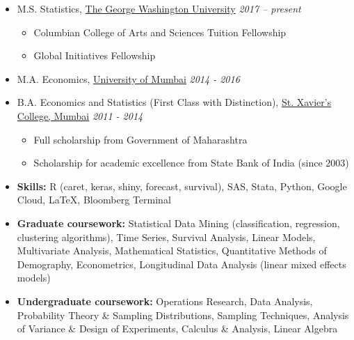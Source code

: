 \documentclass[10pt,a4paper]{article}
\begin{document}
\begin{itemize}
	\itemsep-0.25em
\item M.S. Statistics, \href{https://www.gwu.edu/}{The George Washington University}
\hfill \textit{2017 -- present} 
	\vspace{-0.6em}
	\begin{itemize}
	\itemsep-0.12em
		\item Columbian College of Arts and Sciences Tuition Fellowship
		\item Global Initiatives Fellowship
	\end{itemize}
	\vspace{-0.3em}
\item M.A. Economics, \href{http://mu.ac.in/portal/}{University of Mumbai}
\hfill \textit{2014 - 2016}

\item B.A. Economics and Statistics (First Class with Distinction), \href{http://xaviers.edu/main/}{St. Xavier's College, Mumbai}
\hfill \textit{2011 - 2014}
	\vspace{-0.6em}
	\begin{itemize}
	\itemsep-0.15em
		\item Full scholarship from Government of Maharashtra
		\item Scholarship for academic excellence from State Bank of India (since 2003)
	\end{itemize}
\end{itemize}
\vspace{-0.6cm}
\begin{itemize}
	\itemsep-0.15em
\item \textbf{Skills: }R (caret, keras, shiny, forecast, survival), SAS, Stata, Python, Google Cloud, \LaTeX, Bloomberg Terminal
\item \textbf{Graduate coursework: }Statistical Data Mining (classification, regression, clustering algorithms), Time Series, Survival Analysis, Linear Models, Multivariate Analysis, Mathematical Statistics, Quantitative Methods of Demography, Econometrics, Longitudinal Data Analysis (linear mixed effects models)
\item \textbf{Undergraduate coursework: }Operations Research, Data Analysis, Probability Theory \& Sampling Distributions, Sampling Techniques, Analysis of Variance \& Design of Experiments, Calculus \& Analysis, Linear Algebra 
\end{itemize}
\vspace{-0.6cm}
\end{document}
